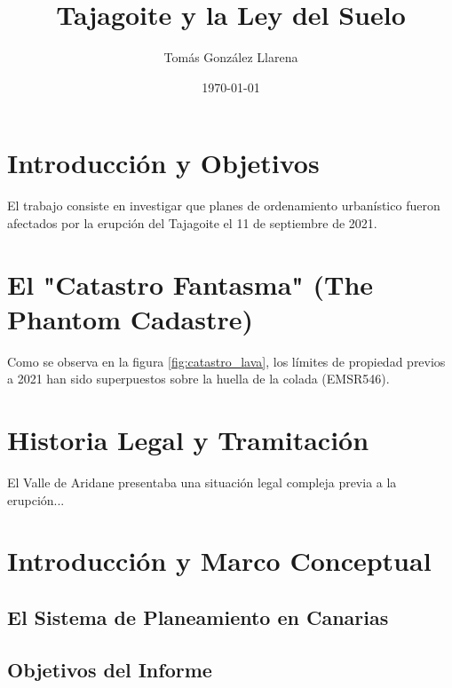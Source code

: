 \documentclass[11pt, a4paper]{article}
\title{Tajagoite y la Ley del Suelo}
\author{Tomás  González Llarena}
\date{\today}
\begin{document}
\maketitle
\tableofcontents
\newpage

\section{Introducción y Objetivos}
El trabajo consiste en investigar que planes de ordenamiento urbanístico fueron afectados por la erupción del Tajagoite el 11 de septiembre de 2021.

\section{El "Catastro Fantasma" (The Phantom Cadastre)}
Como se observa en la figura \ref{fig:catastro_lava}, los límites de propiedad previos a 2021 han sido superpuestos sobre la huella de la colada (EMSR546).


\section{Historia Legal y Tramitación}
El Valle de Aridane presentaba una situación legal compleja previa a la erupción...

\section{Introducción y Marco Conceptual}
\subsection{El Sistema de Planeamiento en Canarias}
\subsection{Objetivos del Informe}
\end{document}
